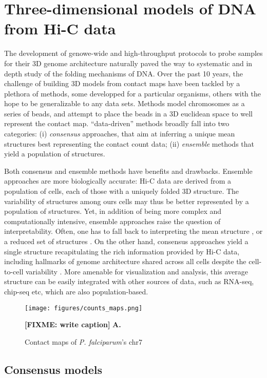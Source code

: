 \documentclass[letterpaper,12pt]{article}
\newcommand{\fixme}[1]{\textbf{[FIXME: #1]}}
\begin{document}
\section*{Three-dimensional models of DNA from Hi-C data}

The development of genowe-wide and high-throughput protocols to probe samples
for their 3D genome architecture naturally paved the way to systematic and in
depth study of the folding mechanisms of DNA. Over the past 10 years, the
challenge of building 3D models from contact maps have been tackled by a
plethora of methods, some developped for a particular organisms, others with
the hope to be generalizable to any data sets. Methods model chromosomes as a
series of beads, and attempt to place the beads in a 3D euclidean space to
well represent the contact map. ``data-driven'' methods broadly fall into two
categories: (i) \textit{consensus} approaches, that aim at inferring a unique
mean structures best representing the contact count data; (ii)
\textit{ensemble} methods that yield a population of structures.

Both consensus and ensemble methods have benefits and drawbacks. Ensemble
approaches are more biologically accurate: Hi-C data are derived from a
population of cells, each of those with a uniquely folded 3D structure. The
variability of structures among ours cells may thus be better represented by a
population of structures. Yet, in addition of being more complex and
computationally intensive, ensemble approaches raise the question of
interpretability. Often, one has to fall back to interpreting the mean
structure \citep{kalhor:genome}, or a reduced set of structures
\citep{rousseau:three}. On the other hand, consensus approaches yield a single
structure recapitulating the rich information provided by Hi-C data, including
hallmarks of genome architecture shared across all cells despite the
cell-to-cell variability \citet{nagano:single-cell}. More amenable for
visualization and analysis, this average structure can be easily integrated
with other sources of data, such as RNA-seq, chip-seq etc, which are also
population-based.


\begin{figure}
\centering
\texttt{[image: figures/counts\_maps.png]}
\caption{Contact maps of {\em P. falciparum}'s chr7}{
\fixme{write caption}
\textbf{A.} \citep{lemieux:genome-wide}}
\label{Fig1}
\end{figure}

\subsection*{Consensus models}
\end{document}
